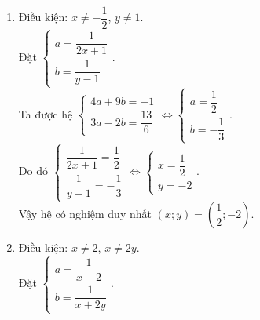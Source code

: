 \begin{bt}
{\begin{enumerate}
			Ta được hệ $\begin{cases} a + 2b = 4\\ 2a - b = 3\end{cases} \Leftrightarrow \begin{cases} a = 2\\ b = 1\end{cases}$. \\
			Do đó $\begin{cases} \dfrac{1}{x} = 2\\ \dfrac{1}{y + 1} = 1\end{cases} \Leftrightarrow \begin{cases} x = \dfrac{1}{2}\\ y = 0\end{cases}$.\\
			Vậy hệ có nghiệm duy nhất $\left(x;y\right) = \left(\dfrac{1}{2};0\right)$.
			\item 
			Điều kiện: $x \ne -\dfrac{1}{2}$, $y \ne 1$.\\
			Đặt $\begin{cases} a = \dfrac{1}{2x+1}\\ b = \dfrac{1}{y- 1}\end{cases}$. \\
			Ta được hệ $\begin{cases} 4a + 9b = -1\\ 3a - 2b = \dfrac{13}{6}\end{cases} \Leftrightarrow \begin{cases} a = \dfrac{1}{2}\\ b = -\dfrac{1}{3}\end{cases}$. \\
			Do đó $\begin{cases} \dfrac{1}{2x+1} = \dfrac{1}{2}\\ \dfrac{1}{y - 1} = -\dfrac{1}{3}\end{cases} \Leftrightarrow \begin{cases} x = \dfrac{1}{2}\\ y = -2\end{cases}$.\\
			Vậy hệ có nghiệm duy nhất $\left(x;y\right) = \left(\dfrac{1}{2};-2\right)$.	
			\item 
			Điều kiện: $x \ne 2$, $x \ne 2y$.\\
			Đặt $\begin{cases} a = \dfrac{1}{x-2}\\ b = \dfrac{1}{x+2y}\end{cases}$.\\ 

\end{enumerate}}
\end{bt}
